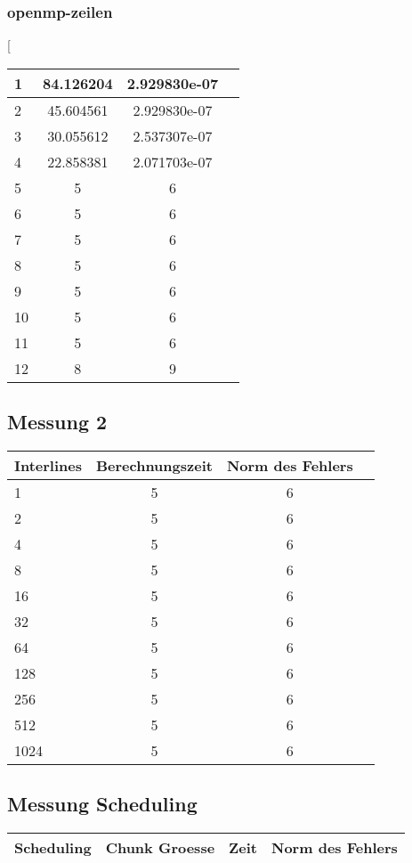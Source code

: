 \documentclass[a4paper]{article}
\begin{document}
	\subsubsection{openmp-zeilen}
	\begin{center}[
		\begin{tabular}{ l | c | c | r } \hline
		 1 & 84.126204 & 2.929830e-07 \\ \hline
		 2 & 45.604561  & 2.929830e-07 \\ \hline
		 3 & 30.055612 & 2.537307e-07 \\ \hline
		 4 & 22.858381 & 2.071703e-07 \\ \hline
		 5 & 5 & 6 \\ \hline
		 6 & 5 & 6 \\ \hline
		 7 & 5 & 6 \\ \hline
		 8 & 5 & 6 \\ \hline
		 9 & 5 & 6 \\ \hline
		 10 & 5 & 6 \\ \hline
		 11 & 5 & 6 \\ \hline
		 12 & 8 & 9 \\ \hline
	   \end{tabular}
	\end{center}
	\subsection*{Messung 2}
		\begin{center}
			\begin{tabular}{ l | c | c | r } \hline
			 Interlines & Berechnungszeit & Norm des Fehlers \\ \hline
			 1 & 5 & 6 \\ \hline
			 2 & 5 & 6 \\ \hline
			 4 & 5 & 6 \\ \hline
			 8 & 5 & 6 \\ \hline
			 16 & 5 & 6 \\ \hline
			 32 & 5 & 6 \\ \hline
			 64 & 5 & 6 \\ \hline
			 128 & 5 & 6 \\ \hline
			 256 & 5 & 6 \\ \hline
			 512 & 5 & 6 \\ \hline
			 1024 & 5 & 6 \\ \hline
		   \end{tabular}
		\end{center}
	\subsection*{Messung Scheduling}
		\begin{center}
			\begin{tabular}{ l | c | c | r } \hline
			 Scheduling & Chunk Groesse & Zeit & Norm des Fehlers \\ \hline
		   \end{tabular}
		\end{center}
\end{document}
